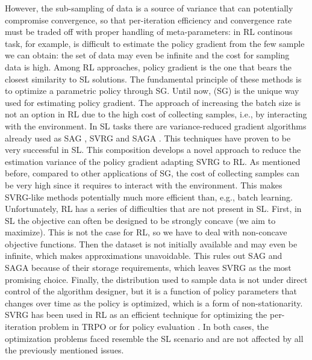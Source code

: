 However, the sub-sampling of data is a source of variance that can potentially compromise convergence, so that per-iteration efficiency and convergence rate must be traded off with proper handling of meta-parameters: in \acs{RL} continous task, for example, is difficult to estimate the policy gradient from the few sample we can obtain:  the set of data may even be infinite and the cost for sampling data is high.
Among RL approaches, policy gradient is the one that bears the closest similarity to \acs{SL} solutions. The fundamental principle of these methods is to optimize a parametric policy through \acs{SG}.
Until now, (\acs{SG}) is the unique way used for estimating policy gradient. The approach of increasing the batch size is not an option in \acs{RL} due to the high cost of collecting samples, i.e., by interacting with the environment. In \acs{SL} tasks there are variance-reduced gradient algorithms already used as \acs{SAG} \citep{roux2012stochastic}, \acs{SVRG} \citep{allen2016variance} and \acs{SAGA} \citep{defazio2014saga}. This techniques have proven to be very successful in \acs{SL}.\newline
This composition develops a novel approach to reduce the estimation variance of the policy gradient adapting \acs{SVRG} to \acs{RL}.\newline
As mentioned before, compared to other applications of \acs{SG}, the cost of collecting samples can be very high since it requires to interact with the environment.
This makes \ac{SVRG}-like methods potentially much more efficient than, e.g., batch learning. 
Unfortunately, RL has a series of difficulties that are not present in \acs{SL}. First, in \acs{SL} the objective can often be designed to be strongly concave (we aim to maximize). This is not the case for \acs{RL}, so we have to deal with non-concave objective functions. Then the dataset is not initially available and may even be infinite, which makes approximations unavoidable. This rules out \acs{SAG} and \acs{SAGA} because of their storage requirements, which leaves \acs{SVRG} as the most promising choice.
Finally, the distribution used to sample data is not under direct control of the algorithm designer, but it is a function of policy parameters that changes over time as the policy is optimized, which is a form of non-stationarity. 
\acs{SVRG} has been used in \acs{RL} as an efficient technique for optimizing the per-iteration problem in \ac{TRPO} \citep{xu2017stochastic} or for policy evaluation \citep{du2017stochastic}. In both cases, the optimization problems faced resemble the \acs{SL} scenario and are not affected by all the previously mentioned issues.
